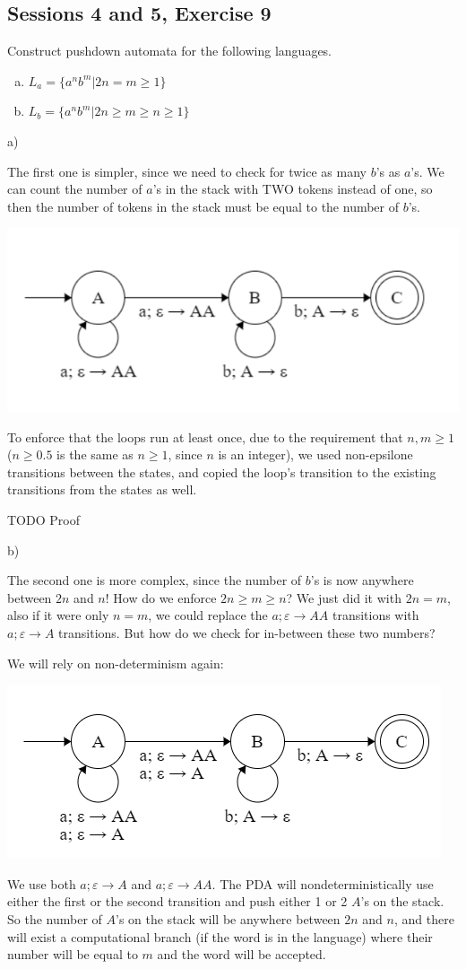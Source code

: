 \subsection{Sessions 4 and 5, Exercise 9}

\label{4_9}


Construct pushdown automata for the following languages.

\begin{enumerate}[a)]
\item $L_a = \{a^nb^m | 2n = m \geq{} 1\}$
\item $L_b = \{a^nb^m | 2n \geq{} m \geq{} n \geq{} 1\}$
\end{enumerate}


a)

The first one is simpler, since we need to check for twice as many $b$'s as $a$'s. We can count the number of $a$'s in the stack with TWO tokens instead of one, so then the number of tokens in the stack must be equal to the number of $b$'s.

\includegraphics[width=0.5\linewidth]{04/4_9_a.png}

To enforce that the loops run at least once, due to the requirement that $n,m\geq{}1$ ($n\geq{}0.5$ is the same as $n\geq{}1$, since $n$ is an integer), we used non-epsilone transitions between the states, and copied the loop's transition to the existing transitions from the states as well.

TODO Proof

b)

The second one is more complex, since the number of $b$'s is now anywhere between $2n$ and $n$! How do we enforce $2n \geq{} m \geq{} n$? We just did it with $2n = m$, also if it were only $n = m$, we could replace the $a; \varepsilon \rightarrow AA$ transitions with  $a; \varepsilon \rightarrow A$ transitions. But how do we check for in-between these two numbers?

We will rely on non-determinism again:

\includegraphics[width=0.5\linewidth]{04/4_9_b.png}

We use both $a; \varepsilon \rightarrow A$ and $a; \varepsilon \rightarrow AA$. The PDA will nondeterministically use either the first or the second transition and push either 1 or 2 $A$'s on the stack. So the number of $A$'s on the stack will be anywhere between $2n$ and $n$, and there will exist a computational branch (if the word is in the language) where their number will be equal to $m$ and the word will be accepted.